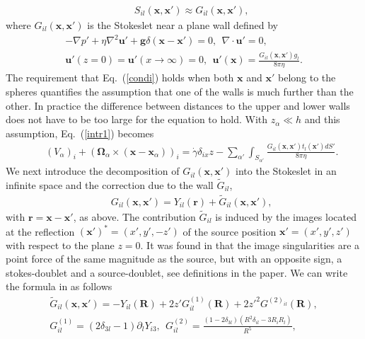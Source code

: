 \begin{eqnarray}&&\!\!\!\!\!\!\!\!\!\!\!\!\!\!\!\!
S_{il}(\bm x, \bm x')\approx G_{il}(\bm x, \bm x'), \label{condi}
\end{eqnarray}
where $G_{il}(\bm x, \bm x')$ is the Stokeslet near a plane wall defined by
\begin{equation} \begin{aligned}
-\nabla p'+\eta \nabla^2 \bm u'+\bm g\delta(\bm x-\bm x')=0,\ \ \nabla\cdot\bm u'=0, \\ \bm u'(z=0)=\bm u'(x\to\infty)=0,\ \
\bm u'(\bm x)=\frac{G_{il}(\bm x, \bm x')g_l}{8\pi \eta}.\label{stokes}
\end{aligned} \end{equation}
The requirement that Eq.~(\ref{condi}) holds when both $\bm x$ and $\bm x'$ belong to the spheres quantifies the assumption that one of the walls is much further than the other. In practice the difference between distances to the upper and lower walls does not have to be too large for the equation to hold. With $z_{\alpha}\ll h$ and this assumption, Eq.~(\ref{intr1}) becomes
\begin{eqnarray}&&\!\!\!\!\!\!\!\!\!\!\!\!\!\!\!\!
(V_{\alpha})_i+(\bm \Omega_{\alpha}\times (\bm x-\bm x_{\alpha}))_i\!=\!\dot{\gamma}\delta_{ix}z
-\!\sum_{\alpha'}\int_{S_{\alpha'}}\!\!\!\frac{G_{il}(\bm x, \bm x')t_{l}(\bm x')dS'}{8\pi \eta}. \label{intr}
\end{eqnarray}
We next introduce the decomposition of $G_{il}(\bm x, \bm x')$ into the Stokeslet in an infinite space and the correction due to the wall ${\tilde G}_{il}$,
\begin{eqnarray}&&\!\!\!\!\!\!\!\!\!\!\!\!\!\!
G_{il}(\bm x, \bm x')=Y_{il}(\bm r)+{\tilde G}_{il}(\bm x, \bm x'), \label{do}
\end{eqnarray}
with $\bm r=\bm x-\bm x'$, as above. The contribution ${\tilde G}_{il}$ is induced by the images located at the reflection $(\bm x')^*=(x', y', -z')$ of the source position $\bm x'=(x', y', z')$ with respect to the plane $z=0$. It was found in \cite{blake_1971} that the image singularities are a point force of the same magnitude as the source, but with an opposite sign, a stokes-doublet and a source-doublet, see definitions in the paper. We can write the formula in \cite{blake_1971} as follows
\begin{equation} \begin{aligned}%
{\tilde G}_{il}(\bm x, \bm x')=-Y_{il}(\bm R)+2z'G^{(1)}_{il}(\bm R)+2z'^2 G^{(2)_{il}}(\bm R),\\ G^{(1)}_{il}\!=\!\left(2\delta_{3l}\!-\!1\right)\partial_l Y_{i3},\ \
G^{(2)}_{il}\!=\!\frac{\left(1\!-\!2\delta_{3l}\right)\left(R^2\delta_{il}\!-\!3R_iR_l\right)}{R^5},\label{gr}
\end{aligned}\end{equation}
